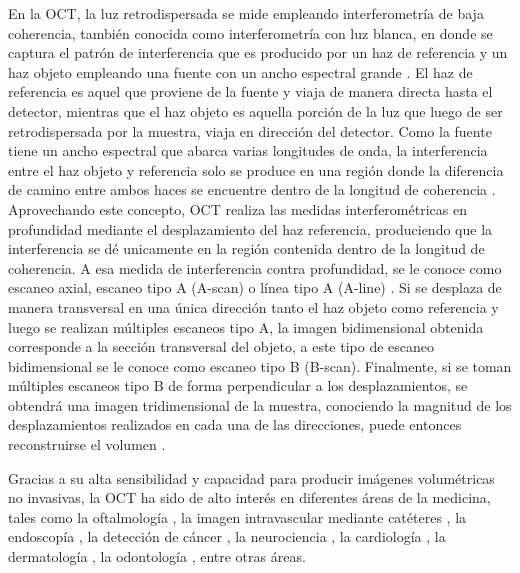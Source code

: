 En la OCT, la luz retrodispersada se mide empleando interferometría de baja coherencia, también conocida como interferometría con luz blanca, en donde se captura el patrón de interferencia que es producido por un haz de referencia y un haz objeto empleando una fuente con un ancho espectral grande \cite{Tomlins, Fercher}. El haz de referencia es aquel que proviene de la fuente y viaja de manera directa hasta el detector, mientras que el haz objeto es aquella porción de la luz que luego de ser retrodispersada por la muestra, viaja en dirección del detector. Como la fuente tiene un ancho espectral que abarca varias longitudes de onda, la interferencia entre el haz objeto y referencia solo se produce en una región donde la diferencia de camino entre ambos haces se encuentre dentro de la longitud de coherencia \cite{Drexler2015}. Aprovechando este concepto, OCT realiza las medidas interferométricas en profundidad mediante el desplazamiento del haz referencia, produciendo que la interferencia se dé unicamente en la región contenida dentro de la longitud de coherencia. A esa medida de interferencia contra profundidad, se le conoce como escaneo axial, escaneo tipo A (A-scan) o línea tipo A (A-line) \cite{Drexler2015}. Si se desplaza de manera transversal en una única dirección tanto el haz objeto como referencia y luego se realizan múltiples escaneos tipo A, la imagen bidimensional obtenida corresponde a la sección transversal del objeto, a este tipo de escaneo bidimensional se le conoce como escaneo tipo B (B-scan). Finalmente, si se toman múltiples escaneos tipo B de forma perpendicular a los desplazamientos, se obtendrá una imagen tridimensional de la muestra, conociendo la magnitud de los desplazamientos realizados en cada una de las direcciones, puede entonces reconstruirse el volumen \cite{Bouma2002}.

Gracias a su alta sensibilidad y capacidad para producir imágenes volumétricas no invasivas, la OCT ha sido de alto interés en diferentes áreas de la medicina, tales como la oftalmología \cite{Schuman1995, Swanson1993, Puliafito1995, Hee1995, Hee1995_2}, la imagen intravascular mediante catéteres \cite{Grube2002, Jang2002, Bouma2003}, la endoscopía \cite{Tearney1997,Feldchtein1998,Rollins1999}, la detección de cáncer \cite{Sergeev1997,Jackle2000}, la neurociencia \cite{Chen2009,Srinivasan2009,Lee2011}, la cardiología \cite{Li2012,Gu2012,Yazdanfar1997}, la dermatología \cite{Welzel1998,Gambichler2007,Blatter2012}, la odontología \cite{Otis2004,Melo2005,Bakhsh2011}, entre otras áreas.

